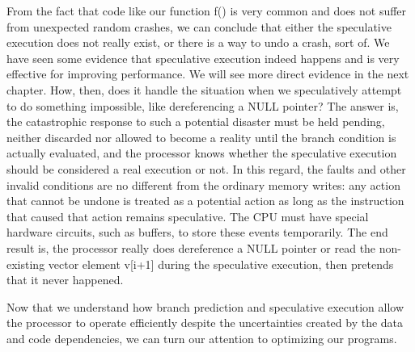 From the fact that code like our function f() is very common and does not suffer from unexpected random crashes, we can conclude that either the speculative execution does not really exist, or there is a way to undo a crash, sort of. We have seen some evidence that speculative execution indeed happens and is very effective for improving performance. We will see more direct evidence in the next chapter. How, then, does it handle the situation when we speculatively attempt to do something impossible, like dereferencing a NULL pointer? The answer is, the catastrophic response to such a potential disaster must be held pending, neither discarded nor allowed to become a reality until the branch condition is actually evaluated, and the processor knows whether the speculative execution should be considered a real execution or not. In this regard, the faults and other invalid conditions are no different from the ordinary memory writes: any action that cannot be undone is treated as a potential action as long as the instruction that caused that action remains speculative. The CPU must have special hardware circuits, such as buffers, to store these events temporarily. The end result is, the processor really does dereference a NULL pointer or read the non-existing vector element v[i+1] during the speculative execution, then pretends that it never happened.

Now that we understand how branch prediction and speculative execution allow the processor to operate efficiently despite the uncertainties created by the data and code dependencies, we can turn our attention to optimizing our programs.































































